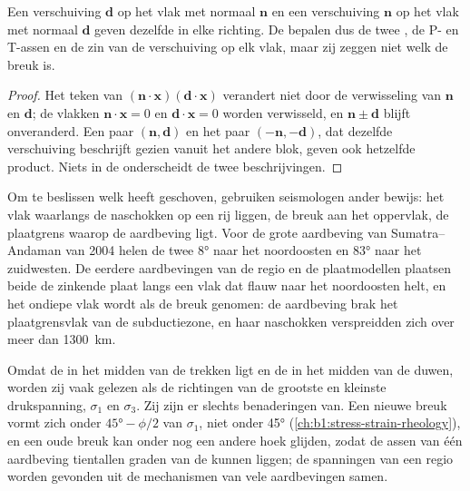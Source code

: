 \begin{proposition}\label{prop:b1:earthquake-source:auxiliary}
Een verschuiving $\mathbf d$ op het vlak met normaal $\mathbf n$ en een verschuiving $\mathbf n$ op het vlak met normaal $\mathbf d$ geven dezelfde  in elke richting. De  bepalen dus de twee , de P- en T-assen en de zin van de verschuiving op elk vlak, maar zij zeggen niet welk  de breuk is.
\end{proposition}

\begin{proof}
Het teken van $(\mathbf n\cdot\mathbf x)(\mathbf d\cdot\mathbf x)$ verandert niet door de verwisseling van $\mathbf n$ en $\mathbf d$; de vlakken $\mathbf n\cdot\mathbf x = 0$ en $\mathbf d\cdot\mathbf x = 0$ worden verwisseld, en $\mathbf n \pm \mathbf d$ blijft onveranderd. Een paar $(\mathbf n, \mathbf d)$ en het paar $(-\mathbf n, -\mathbf d)$, dat dezelfde verschuiving beschrijft gezien vanuit het andere blok, geven ook hetzelfde product. Niets in de  onderscheidt de twee beschrijvingen.
\end{proof}

Om te beslissen welk  heeft geschoven, gebruiken seismologen ander bewijs: het vlak waarlangs de naschokken op een rij liggen, de breuk aan het oppervlak, de plaatgrens waarop de aardbeving ligt. Voor de grote aardbeving van Sumatra--Andaman van 2004 helen de twee  \ang{8} naar het noordoosten en \ang{83} naar het zuidwesten. De eerdere aardbevingen van de regio en de plaatmodellen plaatsen beide de zinkende plaat langs een vlak dat flauw naar het noordoosten helt, en het ondiepe vlak wordt als de breuk genomen: de aardbeving brak het plaatgrensvlak van de subductiezone, en haar naschokken verspreidden zich over meer dan \qty{1300}{km}.

Omdat de  in het midden van de trekken ligt en de  in het midden van de duwen, worden zij vaak gelezen als de richtingen van de grootste en kleinste drukspanning, $\sigma_1$ en $\sigma_3$. Zij zijn er slechts benaderingen van. Een nieuwe breuk vormt zich onder $\ang{45} - \phi/2$ van $\sigma_1$, niet onder \ang{45} (\cref{ch:b1:stress-strain-rheology}), en een oude breuk kan onder nog een andere hoek glijden, zodat de assen van één aardbeving tientallen graden van de  kunnen liggen; de spanningen van een regio worden gevonden uit de mechanismen van vele aardbevingen samen.

